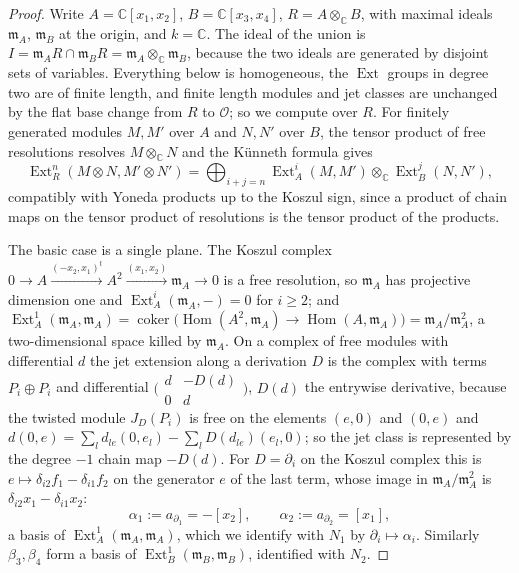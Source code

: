 \documentclass[11pt,reqno]{amsart}
\theoremstyle{plain}
\theoremstyle{definition}
\theoremstyle{remark}
\newcommand{\CC}{\mathbb{C}}
\newcommand{\cO}{\mathcal{O}}
\DeclareMathOperator{\Hom}{Hom}
\DeclareMathOperator{\Ext}{Ext}
\DeclareMathOperator{\coker}{coker}
\begin{document}
\begin{proof}
Write $A=\CC[x_{1},x_{2}]$, $B=\CC[x_{3},x_{4}]$, $R=A\otimes_{\CC}B$, with
maximal ideals $\mathfrak m_{A}$, $\mathfrak m_{B}$ at the origin, and
$k=\CC$. The ideal of the union is $I=\mathfrak m_{A}R\cap\mathfrak m_{B}R
=\mathfrak m_{A}\otimes_{\CC}\mathfrak m_{B}$, because the two ideals are
generated by disjoint sets of variables. Everything below is homogeneous, the
$\Ext$ groups in degree two are of finite length, and finite length modules
and jet classes are unchanged by the flat base change from $R$ to $\cO$; so we
compute over $R$. For finitely generated modules $M,M'$ over $A$ and $N,N'$
over $B$, the tensor product of free resolutions resolves $M\otimes_{\CC}N$
and the K\"unneth formula gives
\begin{equation}\label{eq:kunnethext}
  \Ext^{n}_{R}(M\otimes N,M'\otimes N')
  =\bigoplus_{i+j=n}\Ext^{i}_{A}(M,M')\otimes_{\CC}\Ext^{j}_{B}(N,N'),
\end{equation}
compatibly with Yoneda products up to the Koszul sign, since a product of
chain maps on the tensor product of resolutions is the tensor product of the
products.

The basic case is a single plane. The Koszul complex
$0\to A\xrightarrow{(-x_{2},x_{1})^{t}}A^{2}\xrightarrow{(x_{1},x_{2})}\mathfrak m_{A}\to0$
is a free resolution, so $\mathfrak m_{A}$ has projective dimension one and
$\Ext^{i}_{A}(\mathfrak m_{A},-)=0$ for $i\ge2$; and
$\Ext^{1}_{A}(\mathfrak m_{A},\mathfrak m_{A})=\coker\bigl(\Hom(A^{2},\mathfrak m_{A})
\to\Hom(A,\mathfrak m_{A})\bigr)=\mathfrak m_{A}/\mathfrak m_{A}^{2}$, a
two-dimensional space killed by $\mathfrak m_{A}$. On a complex of free
modules with differential $d$ the jet extension along a derivation $D$ is the
complex with terms $P_{i}\oplus P_{i}$ and differential
$\bigl(\begin{smallmatrix}d&-D(d)\\0&d\end{smallmatrix}\bigr)$, $D(d)$ the
entrywise derivative, because the twisted module $J_{D}(P_{i})$ is free on the
elements $(e,0)$ and $(0,e)$ and $d(0,e)=\sum_{l}d_{le}(0,e_{l})-\sum_{l}D(d_{le})(e_{l},0)$;
so the jet class is represented by the degree $-1$ chain map $-D(d)$. For
$D=\partial_{i}$ on the Koszul complex this is $e\mapsto\delta_{i2}f_{1}-\delta_{i1}f_{2}$
on the generator $e$ of the last term, whose image in
$\mathfrak m_{A}/\mathfrak m_{A}^{2}$ is $\delta_{i2}x_{1}-\delta_{i1}x_{2}$:
\[
  \alpha_{1}:=a_{\partial_{1}}=-[x_{2}],\qquad
  \alpha_{2}:=a_{\partial_{2}}=[x_{1}],
\]
a basis of $\Ext^{1}_{A}(\mathfrak m_{A},\mathfrak m_{A})$, which we identify
with $N_{1}$ by $\partial_{i}\mapsto\alpha_{i}$. Similarly $\beta_{3},\beta_{4}$
form a basis of $\Ext^{1}_{B}(\mathfrak m_{B},\mathfrak m_{B})$, identified
with $N_{2}$.


\end{proof}
\end{document}
